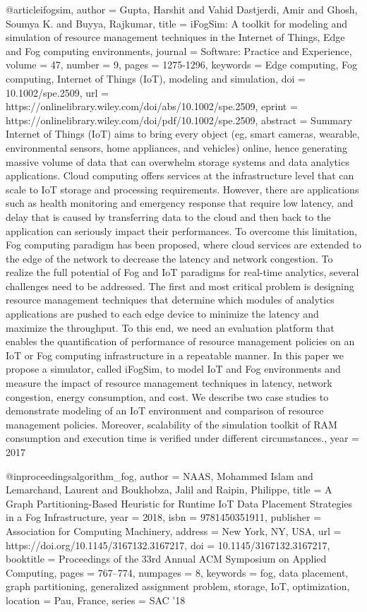 @article{ifogsim,
    author = {Gupta, Harshit and Vahid Dastjerdi, Amir and Ghosh, Soumya K. and Buyya, Rajkumar},
    title = {iFogSim: A toolkit for modeling and simulation of resource management techniques in the Internet of Things, Edge and Fog computing environments},
    journal = {Software: Practice and Experience},
    volume = {47},
    number = {9},
    pages = {1275-1296},
    keywords = {Edge computing, Fog computing, Internet of Things (IoT), modeling and simulation},
    doi = {10.1002/spe.2509},
    url = {https://onlinelibrary.wiley.com/doi/abs/10.1002/spe.2509},
    eprint = {https://onlinelibrary.wiley.com/doi/pdf/10.1002/spe.2509},
    abstract = {Summary Internet of Things (IoT) aims to bring every object (eg, smart cameras, wearable, environmental sensors, home appliances, and vehicles) online, hence generating massive volume of data that can overwhelm storage systems and data analytics applications. Cloud computing offers services at the infrastructure level that can scale to IoT storage and processing requirements. However, there are applications such as health monitoring and emergency response that require low latency, and delay that is caused by transferring data to the cloud and then back to the application can seriously impact their performances. To overcome this limitation, Fog computing paradigm has been proposed, where cloud services are extended to the edge of the network to decrease the latency and network congestion. To realize the full potential of Fog and IoT paradigms for real-time analytics, several challenges need to be addressed. The first and most critical problem is designing resource management techniques that determine which modules of analytics applications are pushed to each edge device to minimize the latency and maximize the throughput. To this end, we need an evaluation platform that enables the quantification of performance of resource management policies on an IoT or Fog computing infrastructure in a repeatable manner. In this paper we propose a simulator, called iFogSim, to model IoT and Fog environments and measure the impact of resource management techniques in latency, network congestion, energy consumption, and cost. We describe two case studies to demonstrate modeling of an IoT environment and comparison of resource management policies. Moreover, scalability of the simulation toolkit of RAM consumption and execution time is verified under different circumstances.},
    year = {2017}
}

@inproceedings{algorithm_fog,
    author = {NAAS, Mohammed Islam and Lemarchand, Laurent and Boukhobza, Jalil and Raipin, Philippe},
    title = {A Graph Partitioning-Based Heuristic for Runtime IoT Data Placement Strategies in a Fog Infrastructure},
    year = {2018},
    isbn = {9781450351911},
    publisher = {Association for Computing Machinery},
    address = {New York, NY, USA},
    url = {https://doi.org/10.1145/3167132.3167217},
    doi = {10.1145/3167132.3167217},
    booktitle = {Proceedings of the 33rd Annual ACM Symposium on Applied Computing},
    pages = {767–774},
    numpages = {8},
    keywords = {fog, data placement, graph partitioning, generalized assignment problem, storage, IoT, optimization},
    location = {Pau, France},
    series = {SAC ’18}
}
  


